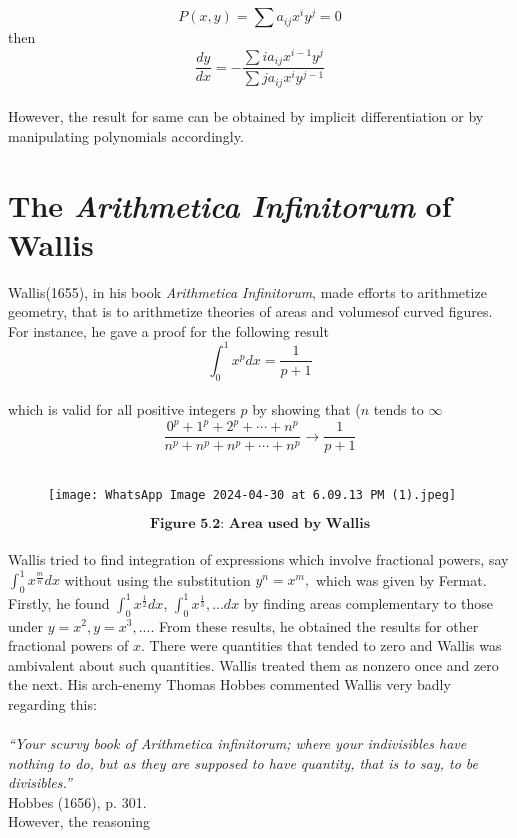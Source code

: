 \documentclass[a4paper,reqno,11pt]{book}
\theoremstyle{plain}%
\theoremstyle{definition}
\begin{document}
$$P(x,y) = \sum a_{ij}x^iy^j = 0$$
then \\
$$ \frac{dy}{dx} = -\frac{\sum ia_{ij}x^{i-1}y^j}{\sum ja_{ij}x^iy^{j-1}} $$
\\
\indent However, the result for same can be obtained by implicit differentiation or by manipulating polynomials accordingly.
\\
\section{ The \textit{Arithmetica Infinitorum} of Wallis}
Wallis(1655), in his book \textit{Arithmetica Infinitorum}, made efforts to arithmetize geometry, that is to arithmetize theories of areas and volumesof curved figures. For instance, he gave a proof for the following result\\
$$\int_{0}^{1}x^p dx = \frac{1}{p+1}$$
\\
which is valid for all positive integers $p$ by showing that ($n$ tends to $\infty$\\
$$\frac{0^p + 1^p + 2^p + \cdots + n^p}{n^p + n^p + n^p + \cdots + n^p} \to \frac{1}{p+1}$$
\\
\begin{figure}
\texttt{[image: WhatsApp Image 2024-04-30 at 6.09.13 PM (1).jpeg]}
\centering
\end{figure}
$$\textbf{Figure 5.2: Area used by Wallis}$$
\\
\indent Wallis tried to find integration of expressions which involve fractional powers, say $\int_{0}^{1}x^{\frac{m}{n}} dx$ without using the substitution $y^n = x^m,$ which was given by Fermat. Firstly, he found $\int_{0}^{1}x^{\frac{1}{2}} dx$, $\int_{0}^{1}x^{\frac{1}{3}},... dx$ by finding areas complementary to those under $y = x^2, y = x^3,....$ From these results, he obtained the results for other fractional powers of $x$.
\indent There were quantities that tended to zero and Wallis was ambivalent about
such quantities. Wallis treated them as nonzero once and
zero the next. His arch-enemy Thomas Hobbes commented Wallis very badly regarding this:\\
\\
\textit{``Your scurvy book of Arithmetica infinitorum; where
your indivisibles have nothing to do, but as they are supposed to have
quantity, that is to say, to be divisibles.”}\cite{ref 3}\\
\vspace{2ex}
\hfill{Hobbes (1656), p. 301.}\\
However, the reasoning
\end{document}
